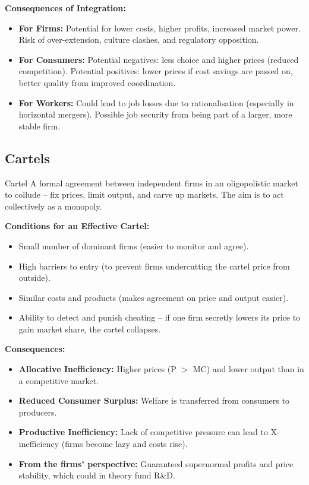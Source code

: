 \documentclass[11pt, a4paper, twoside]{book}
\begin{document}
\textbf{Consequences of Integration:}
\begin{itemize}
  \item \textbf{For Firms:} Potential for lower costs, higher profits, increased market power. Risk of over-extension, culture clashes, and regulatory opposition.
  \item \textbf{For Consumers:} Potential negatives: less choice and higher prices (reduced competition). Potential positives: lower prices if cost savings are passed on, better quality from improved coordination.
  \item \textbf{For Workers:} Could lead to job losses due to rationalisation (especially in horizontal mergers). Possible job security from being part of a larger, more stable firm.
\end{itemize}

\subsection{Cartels}

\begin{keyterm}{Cartel}
A formal agreement between independent firms in an oligopolistic market to collude -- fix prices, limit output, and carve up markets. The aim is to act collectively as a monopoly.
\end{keyterm}

\textbf{Conditions for an Effective Cartel:}
\begin{itemize}
  \item Small number of dominant firms (easier to monitor and agree).
  \item High barriers to entry (to prevent firms undercutting the cartel price from outside).
  \item Similar costs and products (makes agreement on price and output easier).
  \item Ability to detect and punish cheating -- if one firm secretly lowers its price to gain market share, the cartel collapses.
\end{itemize}

\textbf{Consequences:}
\begin{itemize}
  \item \textbf{Allocative Inefficiency:} Higher prices (P $>$ MC) and lower output than in a competitive market.
  \item \textbf{Reduced Consumer Surplus:} Welfare is transferred from consumers to producers.
  \item \textbf{Productive Inefficiency:} Lack of competitive pressure can lead to X-inefficiency (firms become lazy and costs rise).
  \item \textbf{From the firms' perspective:} Guaranteed supernormal profits and price stability, which could in theory fund R\&D.
\end{itemize}
\end{document}
